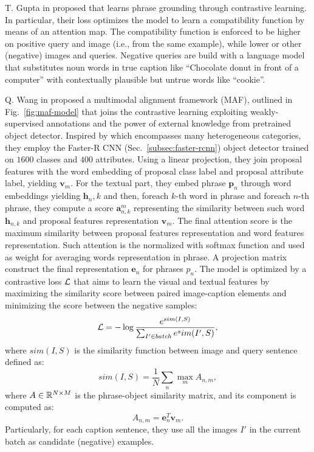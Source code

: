 T. Gupta \etal{} in \cite{gupta2020contrastive} proposed that learns
phrase grounding through contrastive learning. In particular, their
loss optimizes the model to learn a compatibility function by means of
an attention map. The compatibility function is enforced to be higher
on positive query and image (i.e., from the same example), while lower
or other (negative) images and queries. Negative queries are build
with a language model that substitutes noun words in true caption like
``Chocolate donut in front of a computer'' with contextually plausible
but untrue words like ``cookie''.

Q. Wang \etal{} in \cite{wang2020maf} proposed a multimodal alignment
framework (MAF), outlined in Fig.~\ref{fig:maf-model} that joins the
contrastive learning exploiting weakly-supervised annotations and the
power of external knowledge from pretrained object detector. Inspired
by \cite{wang2019phrase} which encompasses many heterogeneous
categories, they employ the Faster-R CNN
(Sec.~\ref{subsec:faster-rcnn}) object detector trained on $1600$
classes and $400$ attributes. Using a linear projection, they join
proposal features with the word embedding of proposal class label and
proposal attribute label, yielding $\bm{v}_m$. For the textual part,
they embed phrase $\bm{p}_n$ through word embeddings yielding
$\bm{h}_n,k$ and then, foreach $k$-th word in phrase and foreach $n$-th
phrase, they compute a score $\bm{a}^m_{n,k}$ representing the
similarity between such word $\bm{h}_{n,k}$ and proposal features
representation $\bm{v}_m$. The final attention score is the maximum
similarity between proposal features representation and word features
representation. Such attention is the normalized with softmax function
and used as weight for averaging words representation in phrase. A
projection matrix construct the final representation $\bm{e}_n$ for
phrases $p_n$. The model is optimized by a contrastive loss $\mathcal{L}$
that aims to learn the visual and textual features by maximizing the
similarity score between paired image-caption elements and minimizing
the score between the negative samples:
\begin{equation}
  \mathcal{L} = - \log \frac{e^{sim(I, S)}}{ \sum_{I' \in batch} e^sim(I', S) },
\end{equation}
where $sim(I, S)$ is the similarity function between image and query
sentence defined as:
\begin{equation}
  sim(I, S) = \frac{1}{N} \sum_n \max_m A_{n,m},
\end{equation}
where $A \in \mathbb{R}^{N \times M}$ is the phrase-object similarity
matrix, and its component is computed as:
\begin{equation}
  A_{n,m} = \bm{e}^T_n \bm{v}_m.
\end{equation}
Particularly, for each caption sentence, they use all the images $I′$
in the current batch as candidate (negative) examples.

